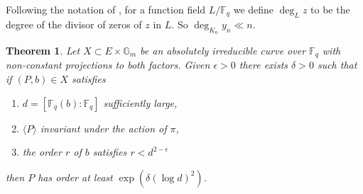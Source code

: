 \documentclass[12pt]{article}
\theoremstyle{plain}
\newtheorem{theorem}{Theorem}
\theoremstyle{definition}
\newcommand{\ang}[1]{\langle#1\rangle}
\def\F{\ensuremath{\mathbb{F}}}
\begin{document}
Following the notation of \cite{voloch2010}, for a function field $L/\F_q$ we define $\deg_Lz$ to 
be the degree of the divisor of zeros of $z$ in $L$. So $\deg_{K_n}y_n \ll n$.
\begin{theorem}
	\label{theo:order-general}
	Let $X \subset E \times \mathbb{G}_m$ be an absolutely irreducible curve over $\F_q$ with 
	non-constant projections to both factors. Given $\epsilon > 0$ there exists $\delta > 0$ such 
	that if $(P, b) \in X$ satisfies
	\begin{enumerate}[leftmargin = *, labelsep = *, align = left, itemsep = -0.1cm, font = 
	\normalfont, label = (\roman*)]
		\item $d = [\F_q(b) : \F_q]$ sufficiently large,
		\item $\ang{P}$ invariant under the action of $\pi$,
		\item the order $r$ of $b$ satisfies $r < d^{2 - \epsilon}$
	\end{enumerate}
	then $P$ has order at least $\exp(\delta (\log d)^2)$.
\end{theorem}
\end{document}
